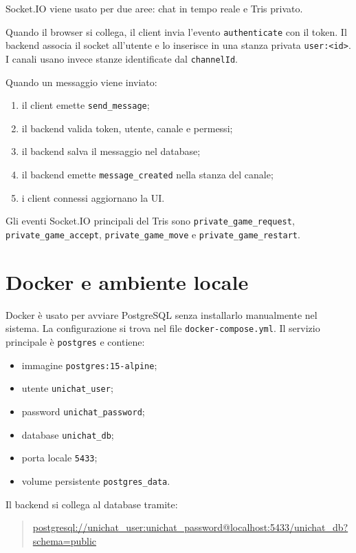 \documentclass[11pt,a4paper]{article}
\begin{document}
Socket.IO viene usato per due aree: chat in tempo reale e Tris privato.

Quando il browser si collega, il client invia l'evento \texttt{authenticate} con il token. Il backend associa il socket all'utente e lo inserisce in una stanza privata \texttt{user:<id>}. I canali usano invece stanze identificate dal \texttt{channelId}.

Quando un messaggio viene inviato:

\begin{enumerate}
  \item il client emette \texttt{send\_message};
  \item il backend valida token, utente, canale e permessi;
  \item il backend salva il messaggio nel database;
  \item il backend emette \texttt{message\_created} nella stanza del canale;
  \item i client connessi aggiornano la UI.
\end{enumerate}

Gli eventi Socket.IO principali del Tris sono \texttt{private\_game\_request}, \texttt{private\_game\_accept}, \texttt{private\_game\_move} e \texttt{private\_game\_restart}.

\section{Docker e ambiente locale}

Docker è usato per avviare PostgreSQL senza installarlo manualmente nel sistema.
La configurazione si trova nel file \texttt{docker-compose.yml}.
Il servizio principale è \texttt{postgres} e contiene:

\begin{itemize}
  \item immagine \texttt{postgres:15-alpine};
  \item utente \texttt{unichat\_user};
  \item password \texttt{unichat\_password};
  \item database \texttt{unichat\_db};
  \item porta locale \texttt{5433};
  \item volume persistente \texttt{postgres\_data}.
\end{itemize}

Il backend si collega al database tramite:

\begin{quote}
\footnotesize
\url{postgresql://unichat_user:unichat_password@localhost:5433/unichat_db?schema=public}
\end{quote}
\end{document}
